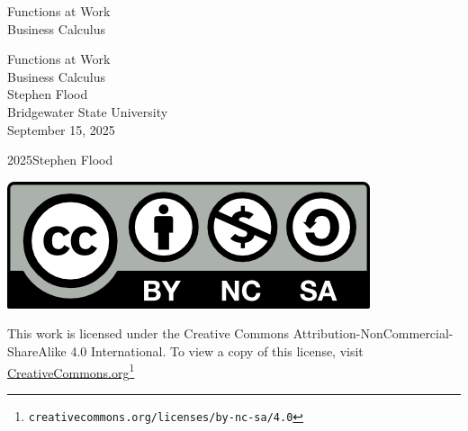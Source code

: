 \documentclass{tufte-book}
\newcommand{\titlepagefont}{\relax}
\numberwithin{equation}{chapter}
\begin{document}
\raggedbottom
\frontmatter
\thispagestyle{empty}
{\titlepagefont\centering
\vspace*{0.28\textheight}
{\Huge Functions at Work}\\[2\baselineskip]
{\LARGE Business Calculus}\\
}
\clearpage
\thispagestyle{empty}
{\titlepagefont\centering
\vspace*{0.14\textheight}
{\Huge Functions at Work}\\[\baselineskip]
{\LARGE Business Calculus}\\[3\baselineskip]
{\Large Stephen Flood}\\[0.5\baselineskip]
{\Large Bridgewater State University}\\[3\baselineskip]
{\Large September 15, 2025}\\}
\clearpage
\thispagestyle{empty}
\hypertarget{frontmatter-2}{}
\noindent\textcopyright{}2025\quad{}Stephen Flood\\[0.5\baselineskip]
\begin{image}{0.425}{0.15}{0.425}{}%
\includegraphics[width=\linewidth]{external/by-nc-sa.png}
\end{image}%
 This work is licensed under the Creative Commons Attribution-NonCommercial-ShareAlike 4.0 International. To view a copy of this license, visit \href{https://creativecommons.org/licenses/by-nc-sa/4.0/}{CreativeCommons.org}\footnote{\nolinkurl{creativecommons.org/licenses/by-nc-sa/4.0}\label{frontmatter-2-2-4-3}}\par\medskip
{}
\null\clearpage
\cleardoublepage
\end{document}
